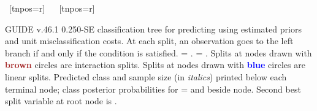 \documentclass{article}
\begin{document}
\begin{landscape}
\begin{center}
{{{{{    ~[tnpos=r]{}
    ~{}
   }
   }
    ~[tnpos=r]{}
    ~{}
   }
 }
 }
 \end{center}
GUIDE v.46.1 0.250-SE
classification tree for predicting \texttt{} using
estimated priors
and unit misclassification costs.
At each split, an observation goes to the left branch 
 if and only if the condition is satisfied.
\texttt{} = \texttt{}.
\texttt{} = \texttt{}.
 Splits at nodes drawn with \textbf{\textcolor{brown}{brown}} circles are interaction splits.
 Splits at nodes drawn with \textbf{\textcolor{blue}{blue}} circles are linear splits.
Predicted class and sample size (in \emph{italics}) printed below each terminal node;
class posterior probabilities for \texttt{} =
 \texttt{} and \texttt{} beside node.
 Second best split variable at root node is \texttt{}.
 \end{landscape}
 
\end{document}
